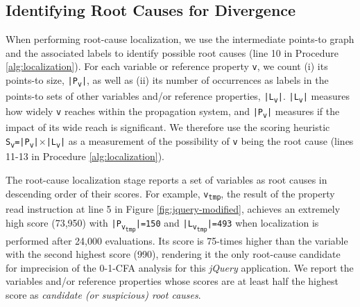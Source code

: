 
\subsection{Identifying Root Causes for Divergence}

When performing root-cause localization, we use the intermediate points-to graph and the associated labels to identify possible root causes (line 10 in Procedure \ref{alg:localization}). For each variable or reference property {\tt v}, we count (i) its points-to size, {\tt |P\textsubscript{v}|}, as well as (ii) its number of occurrences as labels in the points-to sets of other variables and/or reference properties, {\tt |L\textsubscript{v}|}. {\tt |L\textsubscript{v}|} measures how widely {\tt v} reaches within the propagation system, and {\tt |P\textsubscript{v}|} measures if the impact of its wide reach is significant. We therefore use the scoring heuristic {\tt S\textsubscript{v}=|P\textsubscript{v}|$\times$|L\textsubscript{v}|} as a measurement of the possibility of {\tt v} being the root cause (lines 11-13 in Procedure \ref{alg:localization}). 

The root-cause localization stage reports a set of variables as root causes in descending order of their scores. For example, {\tt v\textsubscript{tmp}}, the result of the property read instruction at line 5 in Figure \ref{fig:jquery-modified}, achieves an extremely high score (73,950) with {\tt |P\textsubscript{v\textsubscript{tmp}}|=150} and {\tt |L\textsubscript{v\textsubscript{tmp}}|=493} when localization is performed after 24,000 evaluations. Its score is 75-times higher than the variable with the second highest score (990), rendering it the only root-cause candidate for imprecision of the 0-1-CFA analysis for this {\it jQuery} application. We report the variables and/or reference properties whose scores are at least half the highest score as {\it candidate (or suspicious) root causes}.

